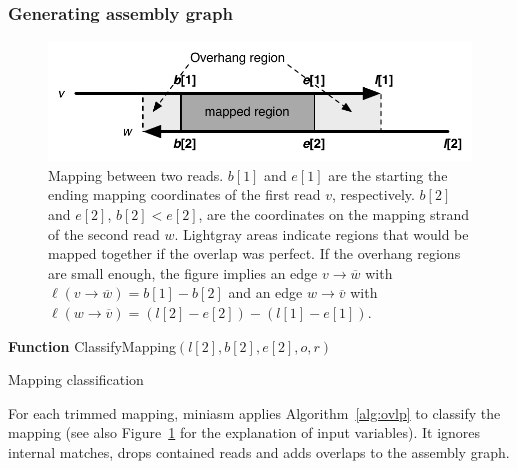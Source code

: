 \documentclass{bioinfo}
\begin{document}
\begin{methods}
\subsubsection{Generating assembly graph}

\begin{figure}[tb]
\centering
\includegraphics[width=.45\textwidth]{overhang}
\caption{Mapping between two reads. $b[1]$ and $e[1]$ are the starting the
ending mapping coordinates of the first read $v$, respectively. $b[2]$ and
$e[2]$, $b[2]<e[2]$, are the coordinates on the mapping strand of the second
read $w$. Lightgray areas indicate regions that would be mapped together if the
overlap was perfect. If the overhang regions are small enough, the figure
implies an edge $v\to\overline{w}$ with $\ell(v\to\overline{w})=b[1]-b[2]$ and
an edge $w\to\overline{v}$ with
$\ell(w\to\overline{v})=(l[2]-e[2])-(l[1]-e[1])$.}\label{fig:overhang}
\end{figure}

\begin{algorithm}[bt]
\DontPrintSemicolon
\footnotesize
{}
\BlankLine
\textbf{Function} {\sc ClassifyMapping}$(l[2], b[2], e[2], o, r)$
\caption{Mapping classification}\label{alg:ovlp}
\end{algorithm}

For each trimmed mapping, miniasm applies Algorithm~\ref{alg:ovlp} to classify the mapping
(see also Figure~\ref{fig:overhang} for the explanation of input variables).
It ignores internal matches, drops contained reads and adds overlaps to the
assembly graph.



\end{methods}
\end{document}
